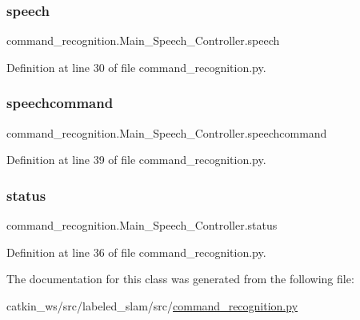 \subsubsection{\texorpdfstring{speech}{speech}}
{\footnotesize\ttfamily command\+\_\+recognition.\+Main\+\_\+\+Speech\+\_\+\+Controller.\+speech}



Definition at line 30 of file command\+\_\+recognition.\+py.

\mbox{\label{classcommand__recognition_1_1_main___speech___controller_a382d3bbe539ba93713ad9b4057e2a226}} 
\subsubsection{\texorpdfstring{speechcommand}{speechcommand}}
{\footnotesize\ttfamily command\+\_\+recognition.\+Main\+\_\+\+Speech\+\_\+\+Controller.\+speechcommand}



Definition at line 39 of file command\+\_\+recognition.\+py.

\mbox{\label{classcommand__recognition_1_1_main___speech___controller_a7b8c9320db0e9e052e46d7261914aa1f}} 
\subsubsection{\texorpdfstring{status}{status}}
{\footnotesize\ttfamily command\+\_\+recognition.\+Main\+\_\+\+Speech\+\_\+\+Controller.\+status}



Definition at line 36 of file command\+\_\+recognition.\+py.



The documentation for this class was generated from the following file\+:\begin{DoxyCompactItemize}
\item 
catkin\+\_\+ws/src/labeled\+\_\+slam/src/\hyperlink{command__recognition_8py}{command\+\_\+recognition.\+py}\end{DoxyCompactItemize}
